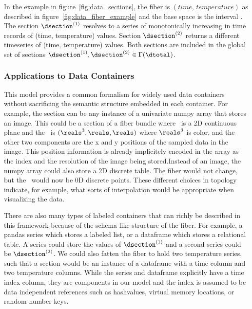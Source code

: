 \documentclass[../main.tex]{subfiles}
\begin{document}
In the example in figure~\ref{fig:data_sections}, the fiber is $(time, \, temperature)$ as described in figure~\ref{fig:data_fiber_example} and the base space is the interval \dbase. The section $\dsection^{(1)}$ resolves to a series of monotonically increasing in time records of (time, temperature) values. Section $\dsection^{(2)}$ returns a different timeseries of (time, temperature) values. Both sections are included in the global set of sections $\dsection^{(1)}, \dsection^{(2)} \in \Gamma(\dtotal)$.


\subsubsection{Applications to Data Containers}
This model provides a common formalism for widely used data containers without sacrificing the semantic structure embedded in each container. For example, the section can be any instance of a univariate numpy array\cite{harris2020array} that stores an image.  This could be a section of a fiber bundle where \dbase\ is a 2D continuous plane and the \dfiber\ is $(\reals^{3}, \reals, \reals)$ where $\reals^3$ is color, and the other two components are the x and y positions of the sampled data in the image. This position information is already implicitely encoded in the array as the index and the resolution of the image being stored.Instead of an image, the numpy array could also store a 2D discrete table. The fiber would not change, but the \dbase\ would now be 0D discrete points. These different choices in topology indicate, for example, what sorts of interpolation would be appropriate when visualizing the data. 

There are also many types of labeled containers that can richly be described in this framework because of the schema like structure of the fiber. For example, a pandas series which stores a labeled list, or a dataframe\cite{jeff_reback_2020_3715232} which stores a relational table. A series could store the values of $\dsection^{(1)}$ and a second series could be  $\dsection^{(2)}$. We could also fatten the fiber to hold two temperature series, such that a section would be an instance of a dataframe with a time column and two temperature columns. While the series and dataframe explicitly have a time index column, they are components in our model and the index is assumed to be data independent references such as hashvalues, virtual memory locations, or random number keys.
\end{document}
